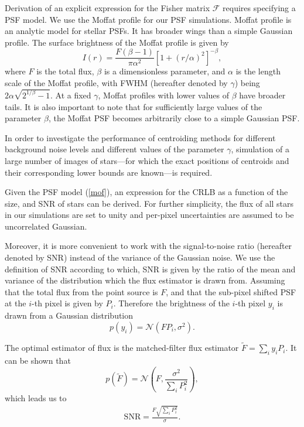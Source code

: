 \documentclass[12pt, preprint]{aastex}
\newcommand{\beq}{\begin{equation}}
\newcommand{\eeq}{\end{equation}}
\begin{document}
Derivation of an explicit expression for the Fisher matrix $\mathcal{F}$ requires specifying a PSF model.
We use the Moffat profile \citep{moffat} for our PSF simulations. 
Moffat profile is an analytic model for stellar PSFs. It has broader wings than
a simple Gaussian profile. The surface brightness of the Moffat profile is given by
\beq
I(r) = \frac{F(\beta -1)}{\pi \alpha^{2}}[1+(r/\alpha)^{2}]^{-\beta},
\label{mof}
\eeq
where $F$ is the total flux, $\beta$ is a dimensionless parameter, and $\alpha$ is
the length scale of the Moffat profile, with FWHM (hereafter denoted by $\gamma$)
being $2\alpha\sqrt{2^{1/\beta}-1}$. At a fixed $\gamma$, Moffat profiles with lower values
of $\beta$ have broader tails. It is also important to note that for sufficiently large values of the 
parameter $\beta$, the Moffat PSF becomes arbitrarily close to a simple Gaussian PSF. 
 
In order to investigate the performance of centroiding methods for
 different background noise levels and different
values of the parameter $\gamma$, simulation of a large number of images of stars---for which the exact positions of centroids
and their corresponding lower bounds are known---is required.

Given the PSF model (\ref{mof}), an expression for the CRLB as a function of the size, and SNR of stars can be 
derived. For further simplicity, the flux of all stars in our simulations are set to unity and per-pixel 
uncertainties are assumed to be uncorrelated Gaussian.

Moreover, it is more convenient to work with the signal-to-noise ratio
(hereafter denoted by SNR) instead of the variance of the Gaussian noise.
We use the definition of SNR according to which, SNR is given by the ratio
 of the mean and variance of the distribution
which the flux estimator is drawn from. Assuming that the total flux from
the point source is $F$, and that the sub-pixel shifted PSF at the $i$-th pixel is given
by $P_{i}$. Therefore the brightness of the $i$-th pixel $y_{i}$ is drawn from
a Gaussian distribution 
\beq
p(y_{i}) = \mathcal{N}(FP_{i},\sigma^{2}). 
\eeq

The optimal estimator of flux is the matched-filter flux estimator 
$\tilde{F}=\sum_{i}y_{i}P_{i}$. It can be shown that 
\beq
p(\tilde{F}) = \mathcal{N}(F , \frac{\sigma^{2}}{\sum_{i}P_{i}^{2}}),
\eeq  
which leads us to
\beq
\begin{array}{l}
\text{SNR} = \frac{F\sqrt{\sum_{i} P_{i}^{2}}}{\sigma}.
\end{array}
\label{snr}
\eeq
\end{document}
